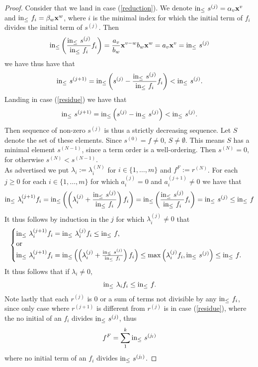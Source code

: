 \begin{proof}
    Consider that we land in case (\ref{reduction}). We denote $\mathrm{in}_\leq\ s^{(j)} = \alpha_v\mathbf{x}^v$ and $\mathrm{in}_\leq\ f_i = \beta_w\mathbf{x}^w$, where $i$ is the minimal index for which the initial term of $f_i$ divides the initial term of $s^{(j)}$. Then   
    $$\inn\left(\frac{\inn\ s^{(j)}}{\inn\ f_i}f_i\right) = \frac{a_v}{b_w}\mathbf{x}^{v-w}b_w\mathbf{x}^w = a_v\mathbf{x}^v=\inn\ s^{(j)}$$
    we have thus have that
    $$\mathrm{in}_\leq\ s^{(j+1)} = \mathrm{in}_\leq \left( s^{(j)}- \frac{\mathrm{in}_\leq\ s^{(j)}}{\mathrm{in}_\leq\ f_i}f_i \right)< \mathrm{in}_\leq \ s^{(j)}.$$
    Landing in case (\ref{residue}) we have that 
    $$\inn\ s^{(j+1)}=\inn\left(s^{(j)}- \inn\ s^{(j)}\right) < \inn\ s^{(j)}.$$
    Then sequence of non-zero $s^{(j)}$ is thus a strictly decreasing sequence. Let $S$ denote the set of these elements. Since $s^{(0)} = f\neq 0$, $S\neq \emptyset$. This means $S$ has a minimal element $s^{(N-1)}$, since a term order is a well-ordering. Then $s^{(N)}=0$, for otherwise $s^{(N)}< s^{(N-1)}$.\\
    As advertised we put $\lambda_i := \lambda_i^{(N)}$ for $i\in \{1,\dots,m\}$ and $f^F := r^{(N)}$. For each $j\geq 0$ for each $i\in\{1,\dots,m\}$ for which $a_i^{(j)} = 0 $ and $a_i^{(j+1)} \neq 0$ we have that
    $$\inn\ \lambda_i^{(j+1)}f_i = \inn\left(\left(\lambda_i^{(j)}+\frac{\inn\ s^{(j)}}{\inn \ f_i}\right)f_i\right)= \inn\left(\frac{\inn\ s^{(j)}}{\inn\ f_i} f_i\right) = \inn\ s^{(j)}\leq \inn\ f$$
    It thus follows by induction in the $j$ for which $\lambda_i^{(j)}\neq 0$ that
    \begin{align*}
        \begin{cases} 
            \inn\  \lambda_i^{(j+1)}f_i = \inn\ \lambda_i^{(j)}f_i\leq \inn\ f, \\
            \text{or}\\
            \inn\ \lambda_i^{(j+1)}f_i = \inn\left(\left(\lambda_i^{(j)}+\frac{\inn\ s^{(j)}}{\inn \ f_i}\right)f_i\right)\leq 
            \max\left(\lambda_i^{(j)}f_i,\inn\ s^{(j)}\right)\leq \inn\ f.
        \end{cases}
    \end{align*}
    It thus follows that if $\lambda_i\neq 0$,
    $$\mathrm{in}_\leq\ \lambda_if_i \leq \mathrm{in}_\leq\ f.$$
    Note lastly that each $r^{(j)}$ is $0$ or a sum of terms not divisible by any $\inn\ f_i$, since only case where $r^{(j+1)}$ is different from $r^{(j)}$ is in case (\ref{residue}), where the no initial of an $f_i$ divides $\mathrm{in}_\leq\ s^{(j)}$, thus 
    $$f^{F} = \sum_1^k \mathrm{in}_\leq \ s^{(j_l)}$$
    where no initial term of an $f_i$ divides $\mathrm{in}_\leq\ s^{(j_l)}$.
\end{proof}
